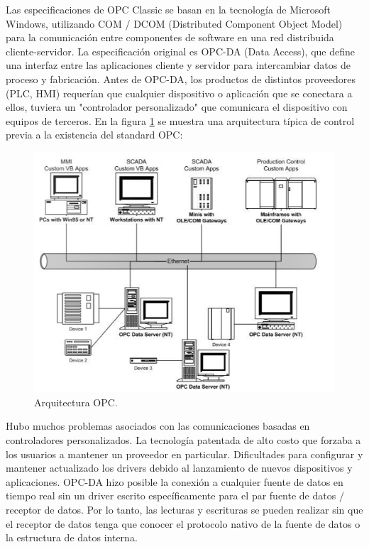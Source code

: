 Las especificaciones de OPC Classic se basan en la tecnología de Microsoft Windows, utilizando COM / DCOM (Distributed Component Object Model) para la comunicación entre componentes de software en una red distribuida cliente-servidor. La especificación original es OPC-DA (Data Access), que define una interfaz entre las aplicaciones cliente y servidor para intercambiar datos de proceso y fabricación. Antes de OPC-DA, los productos de distintos proveedores (PLC, HMI) requerían que cualquier dispositivo o aplicación que se conectara a ellos, tuviera un "controlador personalizado" que comunicara el dispositivo con equipos de terceros. En la figura \ref{fig:OPCAQ} se muestra una arquitectura típica de control previa a la existencia del standard OPC:

\begin{figure}[htpb]
	\centering
	\includegraphics[scale=0.40]{./Figures/opc_1.png}
	\caption{Arquitectura OPC\protect\footnotemark.}
	\label{fig:OPCAQ}
\end{figure}


Hubo muchos problemas asociados con las comunicaciones basadas en controladores personalizados. La tecnología patentada de alto costo que forzaba a los usuarios a mantener un proveedor en particular. Dificultades para configurar y  mantener actualizado los drivers debido al lanzamiento de nuevos dispositivos y aplicaciones. OPC-DA hizo posible la conexión a cualquier fuente de datos en tiempo real sin un driver escrito específicamente para el par fuente de datos / receptor de datos. Por lo tanto, las lecturas y escrituras se pueden realizar sin que el receptor de datos tenga que conocer el protocolo nativo de la fuente de datos o la estructura de datos interna.\\ 

